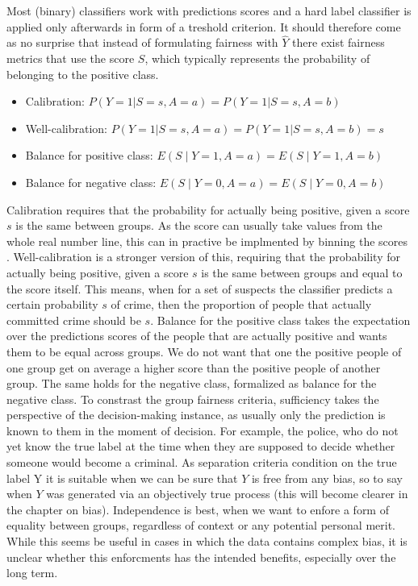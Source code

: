 Most (binary) classifiers work with predictions scores and a hard label classifier is applied only afterwards in form of a treshold criterion. It should therefore come as no surprise that instead of formulating fairness with $\hat{Y}$ there exist fairness metrics that use the score $S$, which typically represents the probability of belonging to the positive class.
\begin{itemize}
    \item Calibration: $P(Y = 1 | S = s, A = a) = P(Y = 1 | S = s, A = b)$
    \item Well-calibration: $P(Y = 1 | S = s, A = a) = P(Y = 1 | S = s, A = b) = s$
    \item Balance for positive class: $E(S \mid Y = 1, A = a) = E(S \mid Y = 1, A = b)$
    \item Balance for negative class: $E(S \mid Y = 0, A = a) = E(S \mid Y = 0, A = b)$
\end{itemize}
Calibration requires that the probability for actually being positive, given a score $s$ is the same between groups. As the score can usually take values from the whole real number line, this can in practive be implmented by binning the scores \cite{verma2018}. Well-calibration is a stronger version of this, requiring that the probability for actually being positive, given a score $s$ is the same between groups and equal to the score itself. This means, when for a set of suspects the classifier predicts a certain probability $s$ of crime, then the proportion of people that actually committed crime should be $s$. Balance for the positive class takes the expectation over the predictions scores of the people that are actually positive and wants them to be equal across groups. We do not want that one the positive people of one group get on average a higher score than the positive people of another group. The same holds for the negative class, formalized as balance for the negative class.
To constrast the group fairness criteria, sufficiency takes the perspective of the decision-making instance, as usually only the prediction is known to them in the moment of decision. For example, the police, who do not yet know the true label at the time when they are supposed to decide whether someone would become a criminal.
As separation criteria condition on the true label Y it is suitable when we can be sure that $Y$ is free from any bias, so to say when $Y$ was generated via an objectively true process (this will become clearer in the chapter on bias).
Independence is best, when we want to enfore a form of equality between groups, regardless of context or any potential personal merit. While this seems be useful in cases in which the data contains complex bias, it is unclear whether this enforcments has the intended benefits, especially over the long term. {\color{red}{reference?}}

